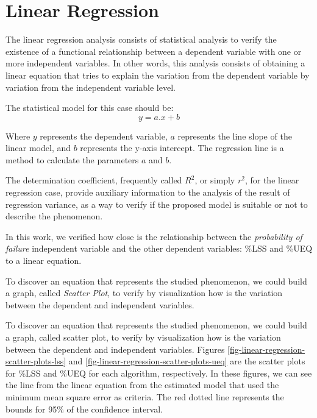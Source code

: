 \section{Linear Regression}

The linear regression analysis consists of statistical analysis to verify the existence of a functional relationship between a dependent variable with one or more independent variables. In other words, this analysis consists of obtaining a linear equation that tries to explain the variation from the dependent variable by variation from the independent variable level.

The statistical model for this case should be:
\begin{equation} 
    \label{eqn_example}
    y = a.x + b
\end{equation}

Where $y$ represents the dependent variable, $a$ represents the line slope of the linear model, and $b$ represents the y-axis intercept. The regression line is a method to calculate the parameters $a$ and $b$.

The determination coefficient, frequently called $R^2$, or simply $r^2$, for the linear regression case, provide auxiliary information to the analysis of the result of regression variance, as a way to verify if the proposed model is suitable or not to describe the phenomenon.

In this work, we verified how close is the relationship between the \textit{probability of failure} independent variable and the other dependent variables: \%LSS and \%UEQ to a linear equation.

To discover an equation that represents the studied phenomenon, we could build a graph, called \textit{Scatter Plot}, to verify by visualization how is the variation between the dependent and independent variables.

To discover an equation that represents the studied phenomenon, we could build a graph, called scatter plot, to verify by visualization how is the variation between the dependent and independent variables. Figures \ref{fig-linear-regression-scatter-plots-lss} and \ref{fig-linear-regression-scatter-plots-ueq} are the scatter plots for \%LSS and \%UEQ for each algorithm, respectively. In these figures, we can see the line from the linear equation from the estimated model that used the minimum mean square error as criteria. The red dotted line represents the bounds for 95\% of the confidence interval.

